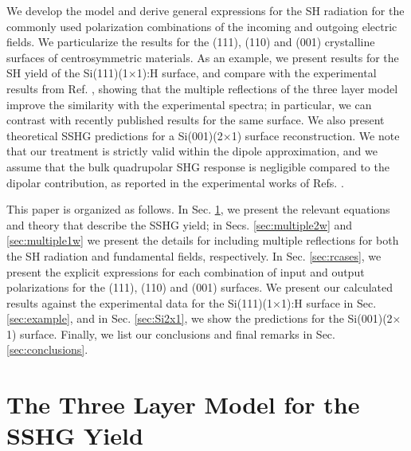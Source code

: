 \documentclass[aps,prb,10pt,showpacs,letterpaper,twocolumn]{revtex4-1}
\begin{document}
We develop the model and derive general expressions for the SH radiation for the
commonly used polarization combinations of the incoming and outgoing electric
fields. We particularize the results for the (111), (110) and (001) crystalline
surfaces of centrosymmetric materials. As an example, we present results for the
SH yield of the Si(111)(1$\times$1):H surface, and compare with the experimental
results from Ref. , showing that the multiple reflections
of the three layer model improve the similarity with the experimental spectra;
in particular, we can contrast with recently published results for the same
surface.\cite{andersonPRB16} We also present theoretical SSHG predictions for a
Si(001)(2$\times$1) surface reconstruction. We note that our treatment is
strictly valid within the dipole approximation, and we assume that the bulk
quadrupolar SHG response is negligible compared to the dipolar contribution, as
reported in the experimental works of Refs. .
 
This paper is organized as follows. In Sec. \ref{sec:threelayer}, we present the
relevant equations and theory that describe the SSHG yield; in Secs.
\ref{sec:multiple2w} and \ref{sec:multiple1w} we present the details for
including multiple reflections for both the SH radiation and fundamental fields,
respectively. In Sec. \ref{sec:rcases}, we present the explicit expressions for
each combination of input and output polarizations for the (111), (110) and
(001) surfaces. We present our calculated results against the experimental data
for the Si(111)(1$\times$1):H surface in Sec. \ref{sec:example}, and in Sec.
\ref{sec:Si2x1}, we show the predictions for the Si(001)(2$\times$1) surface.
Finally, we list our conclusions and final remarks in Sec.
\ref{sec:conclusions}.


\section{The Three Layer Model for the SSHG Yield}\label{sec:threelayer}
\end{document}
